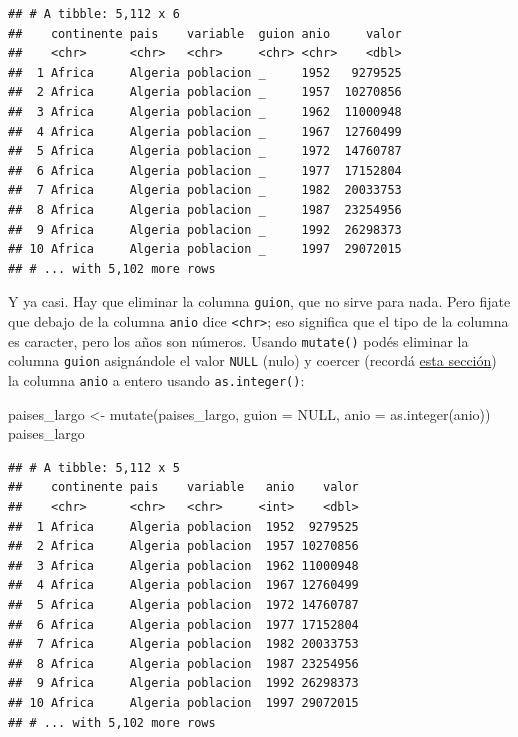 \documentclass[
  openany]{book}
\newenvironment{Shaded}{\begin{snugshade}}{\end{snugshade}}
\newcommand{\AttributeTok}[1]{\textcolor[rgb]{0.77,0.63,0.00}{#1}}
\newcommand{\ConstantTok}[1]{\textcolor[rgb]{0.00,0.00,0.00}{#1}}
\newcommand{\FunctionTok}[1]{\textcolor[rgb]{0.00,0.00,0.00}{#1}}
\newcommand{\NormalTok}[1]{#1}
\newcommand{\OtherTok}[1]{\textcolor[rgb]{0.56,0.35,0.01}{#1}}
\begin{document}
\begin{verbatim}
## # A tibble: 5,112 x 6
##    continente pais    variable  guion anio     valor
##    <chr>      <chr>   <chr>     <chr> <chr>    <dbl>
##  1 Africa     Algeria poblacion _     1952   9279525
##  2 Africa     Algeria poblacion _     1957  10270856
##  3 Africa     Algeria poblacion _     1962  11000948
##  4 Africa     Algeria poblacion _     1967  12760499
##  5 Africa     Algeria poblacion _     1972  14760787
##  6 Africa     Algeria poblacion _     1977  17152804
##  7 Africa     Algeria poblacion _     1982  20033753
##  8 Africa     Algeria poblacion _     1987  23254956
##  9 Africa     Algeria poblacion _     1992  26298373
## 10 Africa     Algeria poblacion _     1997  29072015
## # ... with 5,102 more rows
\end{verbatim}

Y ya casi.
Hay que eliminar la columna \texttt{guion}, que no sirve para nada.
Pero fijate que debajo de la columna \texttt{anio} dice \texttt{\textless{}chr\textgreater{}}; eso significa que el tipo de la columna es caracter, pero los años son números.
Usando \texttt{mutate()} podés eliminar la columna \texttt{guion} asignándole el valor \texttt{NULL} (nulo) y coercer (recordá \href{04-lectura-datos.html\#Vectores}{esta sección}) la columna \texttt{anio} a entero usando \texttt{as.integer()}:

\begin{Shaded}
\begin{Highlighting}[]
\NormalTok{paises\_largo }\OtherTok{\textless{}{-}} \FunctionTok{mutate}\NormalTok{(paises\_largo, }
                       \AttributeTok{guion =} \ConstantTok{NULL}\NormalTok{,}
                       \AttributeTok{anio =} \FunctionTok{as.integer}\NormalTok{(anio))}
\NormalTok{paises\_largo}
\end{Highlighting}
\end{Shaded}

\begin{verbatim}
## # A tibble: 5,112 x 5
##    continente pais    variable   anio    valor
##    <chr>      <chr>   <chr>     <int>    <dbl>
##  1 Africa     Algeria poblacion  1952  9279525
##  2 Africa     Algeria poblacion  1957 10270856
##  3 Africa     Algeria poblacion  1962 11000948
##  4 Africa     Algeria poblacion  1967 12760499
##  5 Africa     Algeria poblacion  1972 14760787
##  6 Africa     Algeria poblacion  1977 17152804
##  7 Africa     Algeria poblacion  1982 20033753
##  8 Africa     Algeria poblacion  1987 23254956
##  9 Africa     Algeria poblacion  1992 26298373
## 10 Africa     Algeria poblacion  1997 29072015
## # ... with 5,102 more rows
\end{verbatim}
\end{document}
